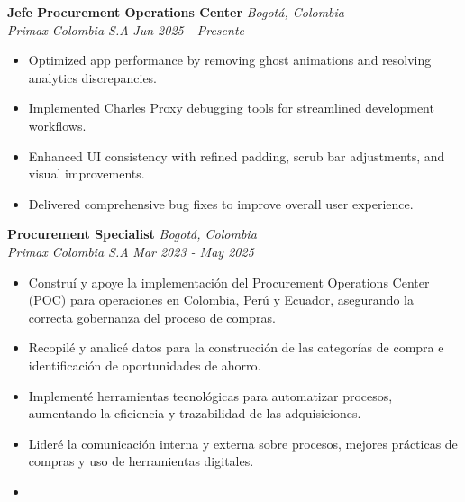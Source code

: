 \documentclass[11pt,a4paper]{article}
\newlength{\jobspacing}
\begin{document}
\textbf{Jefe Procurement Operations Center} \hfill \textit{Bogotá, Colombia} \\
\emph{Primax Colombia S.A} \hfill \textit{Jun 2025 - Presente} \\
\begin{itemize}[leftmargin=*]
    \item Optimized app performance by removing ghost animations and resolving analytics discrepancies.
    \item Implemented Charles Proxy debugging tools for streamlined development workflows.
    \item Enhanced UI consistency with refined padding, scrub bar adjustments, and visual improvements.
    \item Delivered comprehensive bug fixes to improve overall user experience.
\end{itemize}

\vspace{\jobspacing}

\textbf{Procurement Specialist} \hfill \textit{Bogotá, Colombia} \\
\emph{Primax Colombia S.A} \hfill \textit{Mar 2023 - May 2025} \\
\begin{itemize}[leftmargin=*]
    \item Construí y apoye la implementación del Procurement Operations Center (POC) para operaciones en Colombia, Perú y Ecuador, asegurando la correcta gobernanza del proceso de compras.
    \item Recopilé y analicé datos para la construcción de las categorías de compra e identificación de oportunidades de ahorro.
    \item Implementé herramientas tecnológicas para automatizar procesos, aumentando la eficiencia y trazabilidad de las adquisiciones.
    \item Lideré la comunicación interna y externa sobre procesos, mejores prácticas de compras y uso de herramientas digitales.
    \item 
\end{itemize}

\vspace{\jobspacing}
\end{document}
